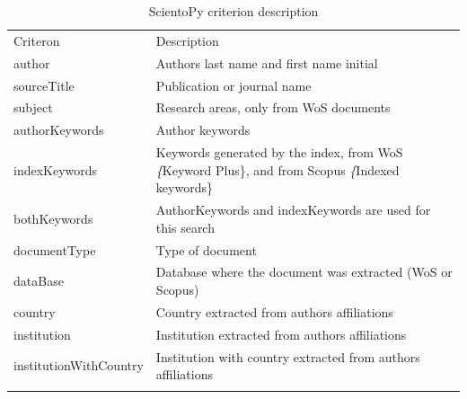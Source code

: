 \documentclass[10pt,letterpaper]{article}
\begin{document}
\begin{table}[h]
	\centering
	\caption{ScientoPy criterion description}
	\label{table_criterion}
	
	
	\begin{tabular}{ p{4cm} p{10cm}}
	\hline\noalign{\smallskip}
	Criteron       & Description                             \\
	\noalign{\smallskip}\hline\noalign{\smallskip}                                                                         
	author        & Authors last name and first name initial                                                                       \\
	sourceTitle    & Publication or journal name                                                                                    \\
	subject        & Research areas, only from WoS documents                                                                        \\
	authorKeywords & Author keywords                                                                                                \\
	indexKeywords  & Keywords generated by the index, from WoS \textit\{Keyword Plus\}, and from Scopus \textit\{Indexed keywords\} \\
	bothKeywords   & AuthorKeywords and indexKeywords are used for this search                                                      \\
	documentType   & Type of document                                                                                               \\
	dataBase       & Database where the document was extracted (WoS or Scopus)                                                      \\
	country        & Country extracted from authors affiliations                                                                    \\
	institution    & Institution extracted from authors affiliations                                                                \\
	institutionWithCountry    & Institution with country extracted from authors affiliations                                        \\
	\noalign{\smallskip}\hline
	\end{tabular}
	
\end{table}
\end{document}
